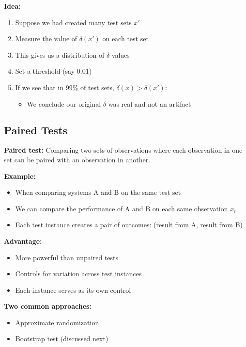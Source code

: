 \documentclass[11pt,a4paper]{article}
\theoremstyle{definition}
\theoremstyle{plain}
\theoremstyle{remark}
\begin{document}
\textbf{Idea:}

\begin{enumerate}
    \item Suppose we had created many test sets $x'$
    \item Measure the value of $\delta(x')$ on each test set
    \item This gives us a distribution of $\delta$ values
    \item Set a threshold (say 0.01)
    \item If we see that in 99\% of test sets, $\delta(x) > \delta(x')$:
    \begin{itemize}
        \item We conclude our original $\delta$ was real and not an artifact
    \end{itemize}
\end{enumerate}

\subsection{Paired Tests}

\textbf{Paired test:} Comparing two sets of observations where each observation in one set can be paired with an observation in another.

\textbf{Example:}
\begin{itemize}
    \item When comparing systems A and B on the same test set
    \item We can compare the performance of A and B on each same observation $x_i$
    \item Each test instance creates a pair of outcomes: (result from A, result from B)
\end{itemize}

\textbf{Advantage:}
\begin{itemize}
    \item More powerful than unpaired tests
    \item Controls for variation across test instances
    \item Each instance serves as its own control
\end{itemize}

\textbf{Two common approaches:}
\begin{itemize}
    \item Approximate randomization
    \item Bootstrap test (discussed next)
\end{itemize}
\end{document}
